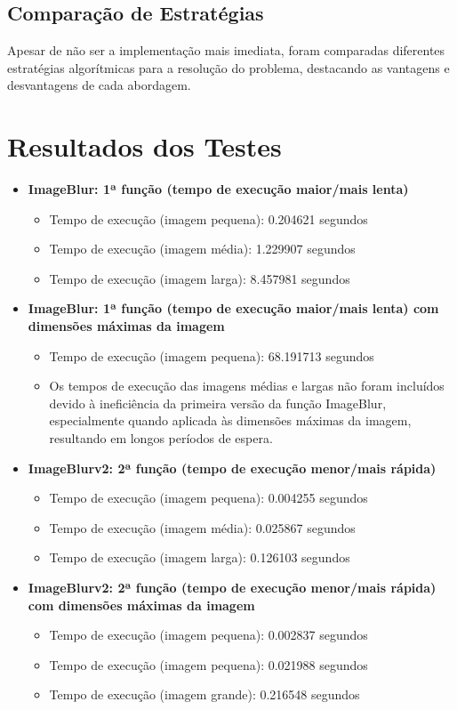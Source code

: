 \documentclass{article}
\begin{document}
\subsection{Comparação de Estratégias}
Apesar de não ser a implementação mais imediata, foram comparadas diferentes estratégias algorítmicas para a resolução do problema, destacando as vantagens e desvantagens de cada abordagem.

\section{Resultados dos Testes}

\begin{itemize}
    \item \textbf{ImageBlur: 1ª função (tempo de execução maior/mais lenta)}
    \begin{itemize}
        \item Tempo de execução (imagem pequena): 0.204621 segundos
        \item Tempo de execução (imagem média): 1.229907 segundos
        \item Tempo de execução (imagem larga): 8.457981 segundos
    \end{itemize}
    
    \item \textbf{ImageBlur: 1ª função (tempo de execução maior/mais lenta) com dimensões máximas da imagem}
    \begin{itemize}
        \item Tempo de execução (imagem pequena): 68.191713 segundos
        \item Os tempos de execução das imagens médias e largas não foram incluídos devido à ineficiência da primeira versão da função ImageBlur, especialmente quando aplicada às dimensões máximas da imagem, resultando em longos períodos de espera.
    \end{itemize}
    
    
    
    \item \textbf{ImageBlurv2: 2ª função (tempo de execução menor/mais rápida)}
    \begin{itemize}
        \item Tempo de execução (imagem pequena): 0.004255 segundos
        \item Tempo de execução (imagem média): 0.025867 segundos
        \item Tempo de execução (imagem larga): 0.126103 segundos
    \end{itemize}
    
    \item \textbf{ImageBlurv2: 2ª função (tempo de execução menor/mais rápida) com dimensões máximas da imagem}
    \begin{itemize}
        \item Tempo de execução (imagem pequena): 0.002837 segundos
        \item Tempo de execução (imagem pequena): 0.021988 segundos
        \item Tempo de execução (imagem grande): 0.216548 segundos
    \end{itemize}
\end{itemize}
\end{document}
